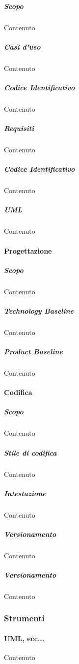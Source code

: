         \subparagraph{Scopo}\label{PP:Sviluppo:AdR:Scopo}
        Contenuto

        \subparagraph{Casi d'uso}\label{PP:Sviluppo:AdR:CasiDUso}
        Contenuto

        \subparagraph{Codice Identificativo}\label{PP:Sviluppo:AdR:CasiDUso:CodiceIdentificativo}
        Contenuto

        \subparagraph{Requisiti}\label{PP:Sviluppo:AdR:Requisiti}
        Contenuto

        \subparagraph{Codice Identificativo}\label{PP:Sviluppo:AdR:Requisiti:CodiceIdentificativo}
        Contenuto

        \subparagraph{UML}\label{PP:Sviluppo:AdR:UML}
        Contenuto


        \paragraph{Progettazione}\label{PP:Sviluppo:Progettazione}

        \subparagraph{Scopo}\label{PP:Sviluppo:Progettazione:Scopo}
        Contenuto

        \subparagraph{Technology Baseline}\label{PP:Sviluppo:Progettazione:TB}
        Contenuto

        \subparagraph{Product Baseline}\label{PP:Sviluppo:Progettazione:PB}
        Contenuto

        \paragraph{Codifica}\label{PP:Sviluppo:Codifica}

        \subparagraph{Scopo}\label{PP:Sviluppo:Codifica:Scopo}
        Contenuto

        \subparagraph{Stile di codifica}\label{PP:Sviluppo:Codifica:Stile}
        Contenuto

        \subparagraph{Intestazione}\label{PP:Sviluppo:Codifica:Intestazione}
        Contenuto

        \subparagraph{Versionamento}\label{PP:Sviluppo:Codifica:Versionamento}
        Contenuto

        \subparagraph{Versionamento}\label{PP:Sviluppo:Codifica:Ricorsione}
        Contenuto

        
        \subsubsection{Strumenti}\label{PP:Sviluppo:Strumenti}

        \paragraph{UML, ecc...}
        Contenuto